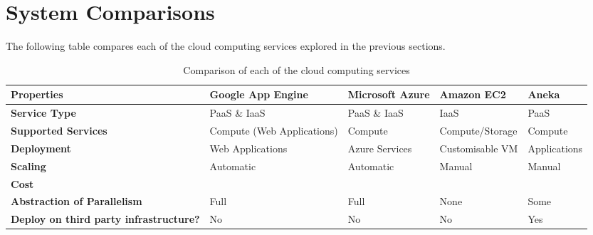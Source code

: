 \chapter{System Comparisons}
The following table compares each of the cloud computing services explored in the previous sections.

\begin{table}[h]
\centering
\begin{tabular}{|p{3.5cm}||p{2.8cm} p{2.8cm} p{2.8cm} p{2.8cm}|}
\hline 
\textbf{Properties} & \textbf{Google App Engine} & \textbf{Microsoft Azure} & \textbf{Amazon EC2} & \textbf{Aneka}\tabularnewline
\hline 
\hline 
\textbf{Service Type} & PaaS \& IaaS & PaaS \& IaaS & IaaS & PaaS \tabularnewline
\hline
\textbf{Supported Services} & Compute (Web Applications) & Compute & Compute/Storage & Compute \tabularnewline
\hline
\textbf{Deployment} & Web Applications & Azure Services & Customisable VM & Applications \tabularnewline
\hline
\textbf{Scaling} & Automatic & Automatic & Manual & Manual \tabularnewline
\hline
\textbf{Cost} & & & & \tabularnewline
\hline
\textbf{Abstraction of Parallelism} & Full & Full & None & Some\tabularnewline
\hline
\textbf{Deploy on third party infrastructure?} & No & No & No & Yes \tabularnewline
\hline
\end{tabular}
\caption{Comparison of each of the cloud computing services}
\end{table}



